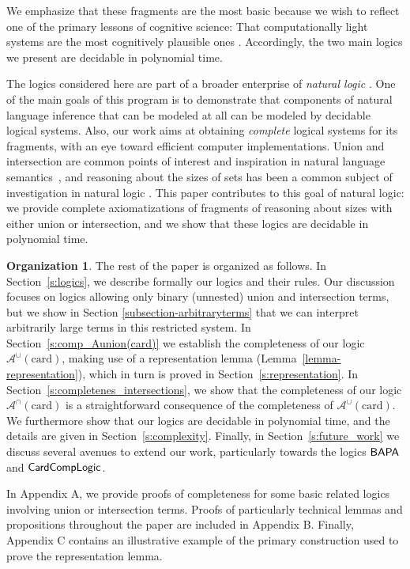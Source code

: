 \documentclass[letterpaper]{article}
\theoremstyle{definition}
\newtheorem*{organization*}{Organization}
\newcommand{\Aunion}{\mathscr{A}^{\cup}}
\newcommand{\Ainter}{\mathscr{A}^{\cap}}
\newcommand{\BAPA}{\sf{BAPA}}
\newcommand{\CardCompLogic}{\sf{CardCompLogic}}
\newcommand{\card}{\mathrm{card}}
\begin{document}
We emphasize that these fragments are the most basic because we wish to reflect one of the primary lessons of cognitive science:  That computationally light systems are the most cognitively plausible ones \cite{reasoning_about_sizes_of_sets}.
Accordingly, the two main logics we present are decidable in polynomial time.

The logics considered here are part of a broader enterprise of \emph{natural logic} \cite{Moss2015,reasoning_about_sizes_of_sets,vanBenthemHistory08}.  One of the main goals of this program is to demonstrate that components of natural language inference that can be modeled at all can be modeled by decidable logical systems.
Also, our work aims at obtaining \emph{complete} logical systems for
its fragments, with an eye toward efficient computer implementations.
Union and intersection are common points of interest and inspiration in natural language semantics~\cite{KeenanFaltz}, and reasoning about the sizes of sets has been a common subject of investigation in natural logic \cite{reasoning_about_sizes_of_sets,pratt_hartmann_2008}.
This paper contributes to this goal of natural logic: we provide complete axiomatizations of fragments of reasoning about sizes with either union or intersection, and we show that these logics are decidable in polynomial time.

\begin{organization*}
The rest of the paper is organized as follows. In Section~\ref{s:logics}, we describe formally our logics and their rules.  Our discussion focuses on logics allowing only binary (unnested) union and intersection terms, but we show in Section \ref{subsection-arbitraryterms} that we can interpret arbitrarily large terms in this restricted system.  In Section~\ref{s:comp_Aunion(card)} we establish the completeness of our logic $\Aunion(\card)$, making use of a representation lemma (Lemma~\ref{lemma-representation}), which in turn is proved in Section~\ref{s:representation}. In Section~\ref{s:completenes_intersections}, we show that the completeness of our logic $\Ainter(\card)$ is a straightforward consequence of the completeness of $\Aunion(\card)$. We furthermore show that our logics are decidable in polynomial time, and the details are given in Section~\ref{s:complexity}. Finally, in Section~\ref{s:future_work} we discuss several
avenues to extend our work, particularly towards the logics $\BAPA$ and $\CardCompLogic$.

In Appendix A, we provide proofs of completeness for some basic related logics involving union or intersection terms.
Proofs of particularly technical lemmas and propositions throughout the paper are included in Appendix B.  Finally, Appendix C contains an illustrative example of the primary construction used to prove the representation lemma.
\end{organization*}
\end{document}

